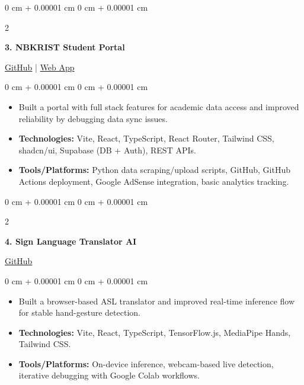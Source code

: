 \documentclass[10pt, a4paper]{article}
\newenvironment{highlights}{
    \begin{itemize}[
        topsep=0.06 cm,
        parsep=0.04 cm,
        partopsep=0pt,
        itemsep=0.02 cm,
        leftmargin=0 cm + 10pt
    ]
}{
    \end{itemize}
}
\newenvironment{onecolentry}{
    \begin{adjustwidth}{
        0 cm + 0.00001 cm
    }{
        0 cm + 0.00001 cm
    }
}{
    \end{adjustwidth}
}
\newenvironment{twocolentry}[2][4.5 cm]{
    \onecolentry
    \def\secondColumn{#2}
    \setcolumnwidth{\fill, #1}
    \begin{paracol}{2}
}{
    \switchcolumn \raggedleft \secondColumn
    \end{paracol}
    \endonecolentry
}
\begin{document}
    \vspace{0.2 cm}

    \begin{twocolentry}{
        \href{https://github.com/nrenx/nbkrist-student-portal}{GitHub} | \href{https://nbkrstudenthub.me/}{Web App}
    }
        \textbf{3. NBKRIST Student Portal}
    \end{twocolentry}
    \begin{onecolentry}
        \begin{highlights}
            \item Built a portal with full stack features for academic data access and improved reliability by debugging data sync issues.
            \item \textbf{Technologies:} Vite, React, TypeScript, React Router, Tailwind CSS, shadcn/ui, Supabase (DB + Auth), REST APIs.
            \item \textbf{Tools/Platforms:} Python data scraping/upload scripts, GitHub, GitHub Actions deployment, Google AdSense integration, basic analytics tracking.
        \end{highlights}
    \end{onecolentry}

    \vspace{0.2 cm}
    \begin{twocolentry}{
        \href{https://github.com/nrenx/Sign-Language-Translator_using_AI-ML}{GitHub}
    }
        \textbf{4. Sign Language Translator AI}
    \end{twocolentry}
    \begin{onecolentry}
        \begin{highlights}
            \item Built a browser-based ASL translator and improved real-time inference flow for stable hand-gesture detection.
            \item \textbf{Technologies:} Vite, React, TypeScript, TensorFlow.js, MediaPipe Hands, Tailwind CSS.
            \item \textbf{Tools/Platforms:} On-device inference, webcam-based live detection, iterative debugging with Google Colab workflows.
        \end{highlights}
    \end{onecolentry}

    \vspace{0.05 cm}
\end{document}
